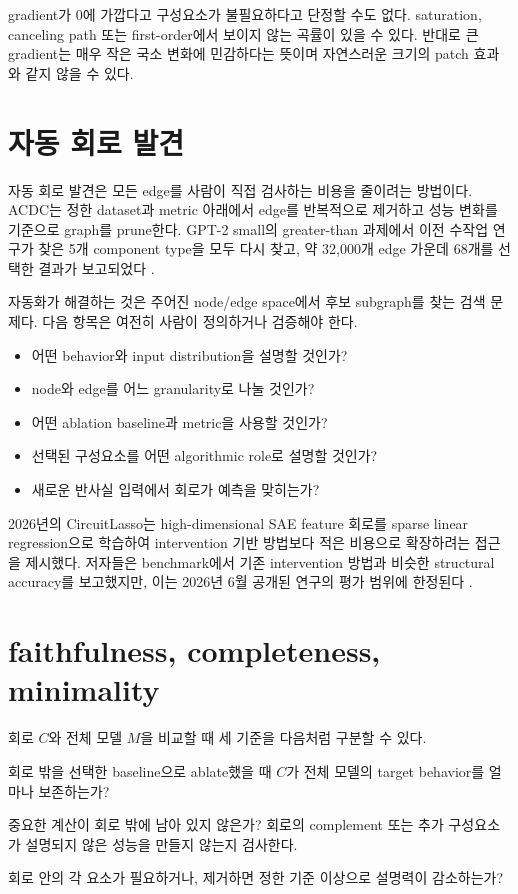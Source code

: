 gradient가 0에 가깝다고 구성요소가 불필요하다고 단정할 수도 없다.
saturation, canceling path 또는 first-order에서 보이지 않는 곡률이 있을 수 있다.
반대로 큰 gradient는 매우 작은 국소 변화에 민감하다는 뜻이며 자연스러운 크기의 patch 효과와 같지 않을 수 있다.

\section{자동 회로 발견}

자동 회로 발견은 모든 edge를 사람이 직접 검사하는 비용을 줄이려는 방법이다.
ACDC는 정한 dataset과 metric 아래에서 edge를 반복적으로 제거하고 성능 변화를 기준으로 graph를 prune한다.
GPT-2 small의 greater-than 과제에서 이전 수작업 연구가 찾은 5개 component type을 모두 다시 찾고, 약 32,000개 edge 가운데 68개를 선택한 결과가 보고되었다 \citep{conmy2023acdc}.

자동화가 해결하는 것은 주어진 node/edge space에서 후보 subgraph를 찾는 검색 문제다.
다음 항목은 여전히 사람이 정의하거나 검증해야 한다.

\begin{itemize}
  \item 어떤 behavior와 input distribution을 설명할 것인가?
  \item node와 edge를 어느 granularity로 나눌 것인가?
  \item 어떤 ablation baseline과 metric을 사용할 것인가?
  \item 선택된 구성요소를 어떤 algorithmic role로 설명할 것인가?
  \item 새로운 반사실 입력에서 회로가 예측을 맞히는가?
\end{itemize}

2026년의 CircuitLasso는 high-dimensional SAE feature 회로를 sparse linear regression으로 학습하여 intervention 기반 방법보다 적은 비용으로 확장하려는 접근을 제시했다.
저자들은 benchmark에서 기존 intervention 방법과 비슷한 structural accuracy를 보고했지만, 이는 2026년 6월 공개된 연구의 평가 범위에 한정된다 \citep{yin2026circuitlasso}.

\section{faithfulness, completeness, minimality}

회로 $C$와 전체 모델 $M$을 비교할 때 세 기준을 다음처럼 구분할 수 있다.

\begin{description}[style=nextline,leftmargin=2em]
  \item[faithfulness]
  회로 밖을 선택한 baseline으로 ablate했을 때 $C$가 전체 모델의 target behavior를 얼마나 보존하는가?

  \item[completeness]
  중요한 계산이 회로 밖에 남아 있지 않은가?
  회로의 complement 또는 추가 구성요소가 설명되지 않은 성능을 만들지 않는지 검사한다.

  \item[minimality]
  회로 안의 각 요소가 필요하거나, 제거하면 정한 기준 이상으로 설명력이 감소하는가?
\end{description}

